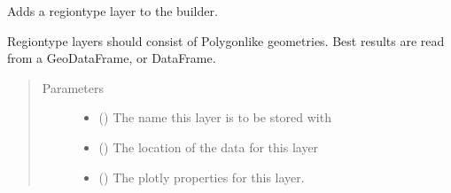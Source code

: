 \documentclass[letterpaper,10pt,english]{sphinxmanual}
\begin{document}
\begin{fulllineitems}
\begin{fulllineitems}
\end{fulllineitems}


\begin{fulllineitems}
\label{\detokenize{builder:geohexviz.builder.PlotBuilder.add_region}}
\sphinxAtStartPar
Adds a region\sphinxhyphen{}type layer to the builder.

\sphinxAtStartPar
Region\sphinxhyphen{}type layers should consist of Polygon\sphinxhyphen{}like geometries.
Best results are read from a GeoDataFrame, or DataFrame.
\begin{quote}\begin{description}
\item[{Parameters}] \leavevmode\begin{itemize}
\item {} 
\sphinxAtStartPar
{} () \textendash{} The name this layer is to be stored with

\item {} 
\sphinxAtStartPar
{} (\sphinxstyleliteralemphasis{\sphinxupquote{{[}}}\sphinxstyleliteralemphasis{\sphinxupquote{, }}\sphinxstyleliteralemphasis{\sphinxupquote{, }}\sphinxstyleliteralemphasis{\sphinxupquote{{]}}}) \textendash{} The location of the data for this layer

\item {} 
\sphinxAtStartPar
{} () \textendash{} The plotly properties for this layer.

\end{itemize}


\end{description}
\end{quote}
\end{fulllineitems}
\end{fulllineitems}
\end{document}
